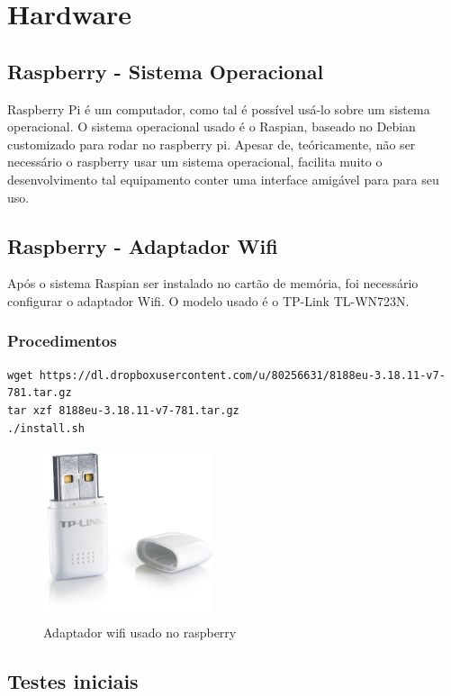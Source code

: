 \section{Hardware}
\label{Sec:5-hardware}
\subsection{Raspberry - Sistema Operacional}

Raspberry Pi é um computador, como tal é possível usá-lo sobre um sistema operacional. O sistema operacional usado é o Raspian, baseado no Debian customizado para rodar no raspberry pi. Apesar de, teóricamente, não ser necessário o raspberry usar um sistema operacional, facilita muito o desenvolvimento tal equipamento conter uma interface amigável para para seu uso.

\subsection{Raspberry - Adaptador Wifi}

Após o sistema Raspian ser instalado no cartão de memória, foi necessário configurar o adaptador Wifi. O modelo usado é o TP-Link TL-WN723N.

\subsubsection{Procedimentos}
\begin{lstlisting}
wget https://dl.dropboxusercontent.com/u/80256631/8188eu-3.18.11-v7-781.tar.gz
tar xzf 8188eu-3.18.11-v7-781.tar.gz
./install.sh
\end{lstlisting}

\begin{figure}[H]
\centering
\includegraphics[width=5cm,height=5cm,keepaspectratio]{figuras/wifi-adapter.jpg}
\caption{\label{fig:wifi-adapter} Adaptador wifi usado no raspberry}
\end{figure}

\subsection{Testes iniciais}

